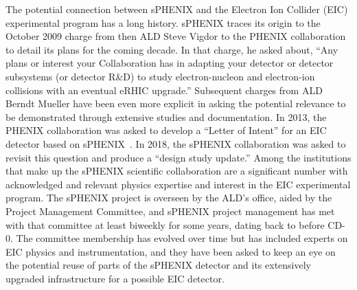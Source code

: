 The potential connection between sPHENIX and the Electron Ion Collider (EIC) experimental
program has a long history.  sPHENIX traces its origin to the October
2009 charge from then ALD Steve Vigdor to the PHENIX collaboration to
detail its plans for the coming decade.  In that charge, he asked
about, ``Any plans or interest your Collaboration has in adapting your
detector or detector subsystems (or detector R\&D) to study
electron-nucleon and electron-ion collisions with an eventual eRHIC
upgrade.''  Subsequent charges from ALD Berndt Mueller have been even
more explicit in asking the potential relevance to be demonstrated
through extensive studies and documentation.  In 2013, the PHENIX
collaboration was asked to develop a ``Letter of Intent'' for an EIC
detector based on sPHENIX~\cite{Adare:2014aaa}.  In 2018, the sPHENIX collaboration was
asked to revisit this question and produce a ``design study update.''
Among the institutions that make up the sPHENIX scientific
collaboration are a significant number with acknowledged and relevant
physics expertise and interest in the EIC experimental program.  The
sPHENIX project is overseen by the ALD's office, aided by the Project
Management Committee, and sPHENIX project management has met with that
committee at least biweekly for some years, dating back to before
CD-0.  The committee membership has evolved over time but has included
experts on EIC physics and instrumentation, and they have been asked
to keep an eye on the potential reuse of parts of the sPHENIX detector
and its extensively upgraded infrastructure for a possible EIC
detector.

